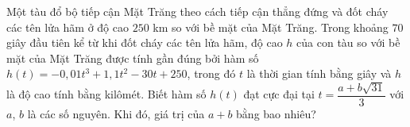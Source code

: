 \begin{ex}%
	Một tàu đổ bộ tiếp cận Mặt Trăng theo cách tiếp cận thẳng đứng và đốt cháy các tên lửa hãm ở độ cao $250$ km so với bề mặt của Mặt Trăng. Trong khoảng $70$ giây đầu tiên kể từ khi đốt cháy các tên lửa hãm, độ cao $h$ của con tàu so với bề mặt của Mặt Trăng được tính gần đúng bởi hàm số $h(t)=-0{,}01 t^3+1{,}1t^2-30t+250$, trong đó $t$ là thời gian tính bằng giây và $h$ là độ cao tính bằng kilômét. Biết hàm số $h(t)$ đạt cực đại tại $t=\dfrac{a+b\sqrt{31}}{3}$ với $a$, $b$ là các số nguyên. Khi đó, giá trị của $a+b$ bằng bao nhiêu?
\end{ex}

